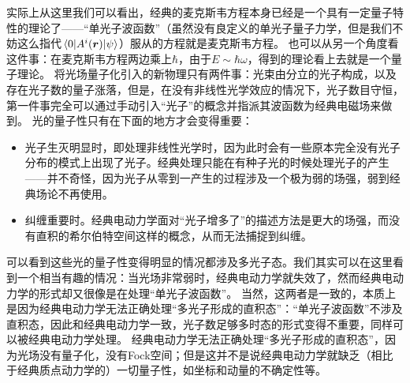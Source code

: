 \documentclass[UTF8, a4paper]{ctexart}
\begin{document}
实际上从这里我们可以看出，经典的麦克斯韦方程本身已经是一个具有一定量子特性的理论了——“单光子波函数”（虽然没有良定义的单光子量子力学，但是我们不妨这么指代$\mel*{0}{A^i(\vb*{r})}{\psi}$）服从的方程就是麦克斯韦方程。
也可以从另一个角度看这件事：在麦克斯韦方程两边乘上$\hbar$，由于$E \sim \hbar \omega$，得到的理论看上去就是一个量子理论。
将光场量子化引入的新物理只有两件事：光束由分立的光子构成，以及存在光子数的量子涨落，但是，在没有非线性光学效应的情况下，光子数目守恒，第一件事完全可以通过手动引入“光子”的概念并指派其波函数为经典电磁场来做到。
光的量子性只有在下面的地方才会变得重要：
\begin{itemize}
    \item 光子生灭明显时，即处理非线性光学时，因为此时会有一些原本完全没有光子分布的模式上出现了光子。经典处理只能在有种子光的时候处理光子的产生——并不奇怪，因为光子从零到一产生的过程涉及一个极为弱的场强，弱到经典场论不再使用。
    \item 纠缠重要时。经典电动力学面对“光子增多了”的描述方法是更大的场强，而没有直积的希尔伯特空间这样的概念，从而无法捕捉到纠缠。
\end{itemize}
可以看到这些光的量子性变得明显的情况都涉及多光子态。我们其实可以在这里看到一个相当有趣的情况：当光场非常弱时，经典电动力学就失效了，然而经典电动力学的形式却又很像是在处理“单光子波函数”。
当然，这两者是一致的，本质上是因为经典电动力学无法正确处理“多光子形成的直积态”：“单光子波函数”不涉及直积态，因此和经典电动力学一致，光子数足够多时态的形式变得不重要，同样可以被经典电动力学处理。
经典电动力学无法正确处理“多光子形成的直积态”，因为光场没有量子化，没有Fock空间；但是这并不是说经典电动力学就缺乏（相比于经典质点动力学的）一切量子性，如坐标和动量的不确定性等。
\end{document}
